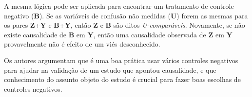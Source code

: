 \documentclass[final,5p]{elsarticle}
\numberwithin{equation}{section}
\begin{document}
    A mesma lógica pode ser aplicada para encontrar um tratamento de controle negativo (\textbf{B}). Se as variáveis de confusão não medidas (\textbf{U}) forem as mesmas para os pares \textbf{Z}+\textbf{Y} e \textbf{B}+\textbf{Y}, então \textbf{Z} e \textbf{B} são ditos \textit{U-comparáveis}. Novamente, se não existe causalidade de \textbf{B} em \textbf{Y}, então uma causalidade observada de \textbf{Z} em \textbf{Y} provavelmente não é efeito de um viés desconhecido.

    Os autores argumentam que é uma boa prática usar vários controles negativos para ajudar na validação de um estudo que apontou causalidade, e que conhecimento do assunto objeto do estudo é crucial para fazer boas escolhas de controles negativos.











\end{document}
